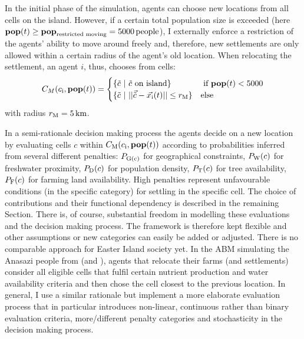 In the initial phase of the simulation, agents can choose new locations from all cells on the island.
However, if a certain total population size is exceeded (here $\mathbf{pop}(t)\geq \mathbf{pop}_\text{restricted moving} = 5000 \, \rm{people}$), I externally enforce a restriction of the agents' ability to move around freely and, therefore, new settlements are only allowed within a certain radius of the agent's old location.
When relocating the settlement, an agent $i$, thus, chooses from cells:
\begin{equation}
C_{M}(c_{\rm i}, \mathbf{pop}(t)) = 
\begin{cases}
\{\tilde{c} \ | \ \tilde{c}\text{ on island}\} & \text{ if } \mathbf{pop}(t) <5000 \\
\{\tilde{c} \ | \ | | \vec{\tilde{c}} - \vec{x_{\rm i}}(t) | |
\leq r_{\rm M} \} & \text{else} 
\end{cases}
\end{equation}
with radius $r_{\rm M} = 5\, {\rm km}$.

In a semi-rationale decision making process the agents decide on a new location by evaluating cells $c$ within $C_{\rm M} (c_{\rm i}, \mathbf{pop}(t))$ according to probabilities inferred from several different penalties:
$P_{\rm G(c)}$ for geographical constraints, $P_{\rm W}(c)$ for freshwater proximity, $P_{\rm D}(c)$ for population density, $P_{\rm T}(c)$ for tree availability, $P_{\rm F}(c)$ for farming land availability.
High penalties represent unfavourable conditions (in the specific category) for settling in the specific cell.
The choice of contributions and their functional dependency is described in the remaining Section.
There is, of course, substantial freedom in modelling these evaluations and the decision making process.
The framework is therefore kept flexible and other assumptions or new categories can easily be added or adjusted.
There is no comparable approach for Easter Island society yet.
In the ABM simulating the Anasazi people from \citet{Axtell2002} (and \citet{Janssen2009}), agents that relocate their farms (and settlements) consider all eligible cells that fulfil certain nutrient production and water availability criteria and then chose the cell closest to the previous location.
In general, I use a similar rationale but implement a more elaborate evaluation process that in particular introduces non-linear, continuous rather than binary evaluation criteria, more/different penalty categories and stochasticity in the decision making process.  

